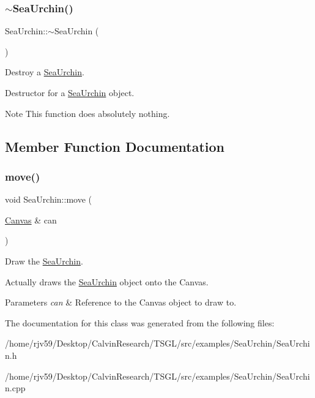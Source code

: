 \subsubsection{\texorpdfstring{$\sim$\+Sea\+Urchin()}{~SeaUrchin()}}
{\footnotesize\ttfamily Sea\+Urchin\+::$\sim$\+Sea\+Urchin (\begin{DoxyParamCaption}{ }\end{DoxyParamCaption})\hspace{0.3cm}{\ttfamily [virtual]}}



Destroy a \hyperlink{class_sea_urchin}{Sea\+Urchin}. 

Destructor for a \hyperlink{class_sea_urchin}{Sea\+Urchin} object. \begin{DoxyNote}{Note}
This function does absolutely nothing. 
\end{DoxyNote}


\subsection{Member Function Documentation}
\mbox{\label{class_sea_urchin_aa0e038a0faecaead5928edc082dbc685}} 
\subsubsection{\texorpdfstring{move()}{move()}}
{\footnotesize\ttfamily void Sea\+Urchin\+::move (\begin{DoxyParamCaption}\item[{\hyperlink{classtsgl_1_1_canvas}{Canvas} \&}]{can }\end{DoxyParamCaption})}



Draw the \hyperlink{class_sea_urchin}{Sea\+Urchin}. 

Actually draws the \hyperlink{class_sea_urchin}{Sea\+Urchin} object onto the Canvas. 
\begin{DoxyParams}{Parameters}
{\em can} & Reference to the Canvas object to draw to. \\
\hline
\end{DoxyParams}


The documentation for this class was generated from the following files\+:\begin{DoxyCompactItemize}
\item 
/home/rjv59/\+Desktop/\+Calvin\+Research/\+T\+S\+G\+L/src/examples/\+Sea\+Urchin/Sea\+Urchin.\+h\item 
/home/rjv59/\+Desktop/\+Calvin\+Research/\+T\+S\+G\+L/src/examples/\+Sea\+Urchin/Sea\+Urchin.\+cpp\end{DoxyCompactItemize}
